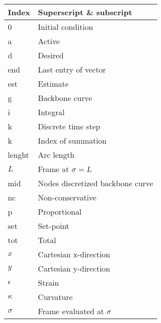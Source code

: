 \begin{spacing}{0.9}
\begin{multicols}{2}
\begin{table}[H]
\centering
    \begin{tabular}{p{1.5cm} p{5cm}} \hline
    \textbf{Index}    &   \textbf{Superscript \& subscript}\\ \hline
    0     &  Initial condition \\
    a     &  Active \\
    d     &  Desired \\
    end   & Last entry of vector \\
    est   & Estimate \\
    g     & Backbone curve \\
    i     & Integral \\
    k     & Discrete time step \\
    k     & Index of summation \\
    lenght & Arc length \\
    $L$   & Frame at $\sigma = L$ \\
    mid    & Nodes discretized backbone curve \\
    nc    & Non-conservative \\
    p    & Proportional \\
    set   & Set-point \\
    tot    & Total \\
    $x$    & Cartesian x-direction \\
    $y$    & Cartesian y-direction \\
    $\epsilon$  & Strain \\
    $\kappa$ & Curvature \\ 
    $\sigma$   & Frame evaluated at $\sigma$ \\\hline
    \end{tabular}
\end{table}







\end{multicols}
\end{spacing}
